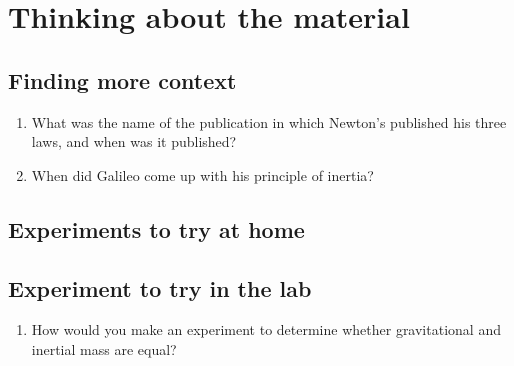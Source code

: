 \section{Thinking about the material}

\subsection{Finding more context}
\begin{enumerate}
\item What was the name of the publication in which Newton's published his three laws, and when was it published?
\item When did Galileo come up with his principle of inertia?
\end{enumerate}

\subsection{Experiments to try at home}

\subsection{Experiment to try in the lab}
\begin{enumerate}
\item How would you make an experiment to determine whether gravitational and inertial mass are equal?
\end{enumerate}

